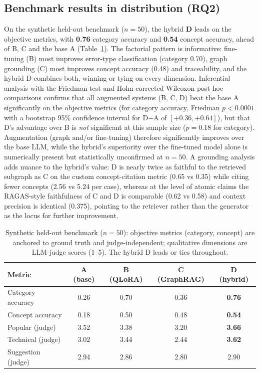 \documentclass[sageh]{sagej}
\begin{document}
\subsection{Benchmark results in distribution (RQ2)}
On the synthetic held-out benchmark ($n=50$), the hybrid \textbf{D} leads on the objective metrics, with \textbf{0.76} category accuracy and \textbf{0.54} concept accuracy, ahead of B, C and the base A (Table~\ref{tab:n50}). The factorial pattern is informative: fine-tuning (B) most improves error-type classification (category 0.70), graph grounding (C) most improves concept accuracy (0.48) and traceability, and the hybrid D combines both, winning or tying on every dimension. Inferential analysis with the Friedman test and Holm-corrected Wilcoxon post-hoc comparisons confirms that all augmented systems (B, C, D) beat the base A significantly on the objective metrics (for category accuracy, Friedman $p<0.0001$ with a bootstrap 95\% confidence interval for D$-$A of $[+0.36,+0.64]$), but that D's advantage over B is \emph{not} significant at this sample size ($p=0.18$ for category). Augmentation (graph and/or fine-tuning) therefore significantly improves over the base LLM, while the hybrid's superiority over the fine-tuned model alone is numerically present but statistically unconfirmed at $n=50$. A grounding analysis adds nuance to the hybrid's value: D is nearly twice as faithful to the retrieved subgraph as C on the custom concept-citation metric (0.65 vs 0.35) while citing fewer concepts (2.56 vs 5.24 per case), whereas at the level of atomic claims the RAGAS-style faithfulness of C and D is comparable (0.62 vs 0.58) and context precision is identical (0.375), pointing to the retriever rather than the generator as the locus for further improvement.

\begin{table}[t]
\centering
\caption{Synthetic held-out benchmark ($n=50$): objective metrics (category, concept) are anchored to ground truth and judge-independent; qualitative dimensions are LLM-judge scores (1--5). The hybrid D leads or ties throughout.\label{tab:n50}}
\begin{tabular}{@{}lcccc@{}}
\toprule
Metric & A (base) & B (QLoRA) & C (GraphRAG) & D (hybrid) \\
\midrule
Category accuracy   & 0.26 & 0.70 & 0.36 & \textbf{0.76} \\
Concept accuracy    & 0.18 & 0.50 & 0.48 & \textbf{0.54} \\
Popular (judge)     & 3.52 & 3.38 & 3.20 & \textbf{3.66} \\
Technical (judge)   & 3.02 & 3.44 & 2.44 & \textbf{3.62} \\
Suggestion (judge)  & 2.94 & 2.86 & 2.80 & 2.90 \\
\bottomrule
\end{tabular}
\end{table}
\end{document}
